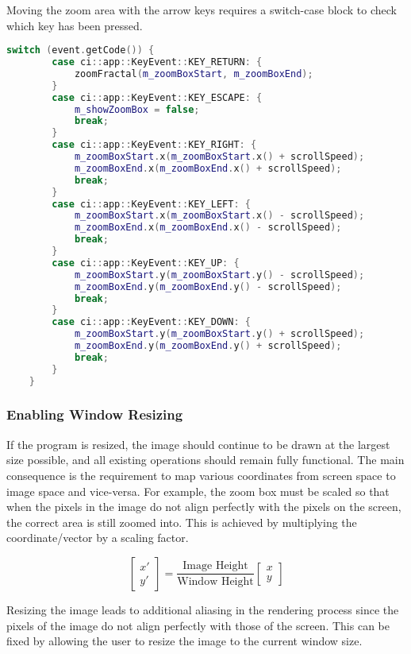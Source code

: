 Moving the zoom area with the arrow keys requires a switch-case block to check which key has been pressed.

\begin{lstlisting}[language=c++]
	switch (event.getCode()) {
		case ci::app::KeyEvent::KEY_RETURN: {
			zoomFractal(m_zoomBoxStart, m_zoomBoxEnd);
		}
		case ci::app::KeyEvent::KEY_ESCAPE: {
			m_showZoomBox = false;
			break;
		}
		case ci::app::KeyEvent::KEY_RIGHT: {
			m_zoomBoxStart.x(m_zoomBoxStart.x() + scrollSpeed);
			m_zoomBoxEnd.x(m_zoomBoxEnd.x() + scrollSpeed);
			break;
		}
		case ci::app::KeyEvent::KEY_LEFT: {
			m_zoomBoxStart.x(m_zoomBoxStart.x() - scrollSpeed);
			m_zoomBoxEnd.x(m_zoomBoxEnd.x() - scrollSpeed);
			break;
		}
		case ci::app::KeyEvent::KEY_UP: {
			m_zoomBoxStart.y(m_zoomBoxStart.y() - scrollSpeed);
			m_zoomBoxEnd.y(m_zoomBoxEnd.y() - scrollSpeed);
			break;
		}
		case ci::app::KeyEvent::KEY_DOWN: {
			m_zoomBoxStart.y(m_zoomBoxStart.y() + scrollSpeed);
			m_zoomBoxEnd.y(m_zoomBoxEnd.y() + scrollSpeed);
			break;
		}
	}
\end{lstlisting}

\subsubsection{Enabling Window Resizing}

If the program is resized, the image should continue to be drawn at the largest size possible, and all existing operations should remain fully functional. The main consequence is the requirement to map various coordinates from screen space to image space and vice-versa. For example, the zoom box must be scaled so that when the pixels in the image do not align perfectly with the pixels on the screen, the correct area is still zoomed into. This is achieved by multiplying the coordinate/vector by a scaling factor.

\begin{equation*}  \label{screenToImageSpace}
	\begin{bmatrix} x' \\ y' \end{bmatrix} = \frac{\text{Image Height}}{\text{Window Height}} \begin{bmatrix} x \\ y \end{bmatrix}
\end{equation*}

Resizing the image leads to additional aliasing in the rendering process since the pixels of the image do not align perfectly with those of the screen. This can be fixed by allowing the user to resize the image to the current window size.


